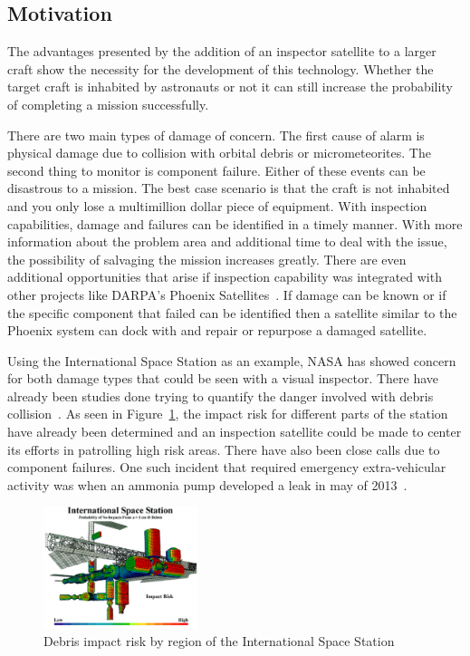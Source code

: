 \documentclass[journal, 10pt]{IEEEtran}
\begin{document}
\subsection{Motivation}
The advantages presented by the addition of an inspector satellite to a larger craft show the necessity for the development of this technology.  Whether the target craft is inhabited by astronauts or not it can still increase the probability of completing a mission successfully.

There are two main types of damage of concern.  The first cause of alarm is physical damage due to collision with orbital debris or micrometeorites.  The second thing to monitor is component failure.  Either of these events can be disastrous to a mission.  The best case scenario is that the craft is not inhabited and you only lose a multimillion dollar piece of equipment.  With inspection capabilities, damage and failures can be identified in a timely manner.  With more information about the problem area and additional time to deal with the issue, the possibility of salvaging the mission increases greatly.  There are even additional opportunities that arise if inspection capability was integrated with other projects like DARPA’s Phoenix Satellites~\cite{Phoenix}.  If damage can be known or if the specific component that failed can be identified then a satellite similar to the Phoenix system can dock with and repair or repurpose a damaged satellite.


Using the International Space Station as an example, NASA has showed concern for both damage types that could be seen with a visual inspector.  There have already been studies done trying to quantify the danger involved with debris collision~\cite{Risk}.  As seen in Figure~\ref{ISS_risk}, the impact risk for different parts of the station have already been determined and an inspection satellite could be made to center its efforts in patrolling high risk areas.  There have also been close calls due to component failures.  One such incident that required emergency extra-vehicular activity was when an ammonia pump developed a leak in may of 2013~\cite{Ammonia}.

\begin{figure}[tb]
\begin{center}
\includegraphics[width=0.4\textwidth]{figures/ISS_impact_risk}
\caption{Debris impact risk by region of the International Space Station}
\label{ISS_risk}
\end{center}
\end{figure}
\end{document}
